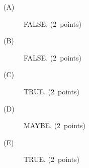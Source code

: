 \begin{description}
\item[(A)] FALSE. \hfill\mbox{(2 points)}
\item[(B)] FALSE. \hfill\mbox{(2 points)}
\item[(C)] TRUE. \hfill\mbox{(2 points)}
\item[(D)] MAYBE. \hfill\mbox{(2 points)}
\item[(E)] TRUE. \hfill\mbox{(2 points)}
\end{description}
